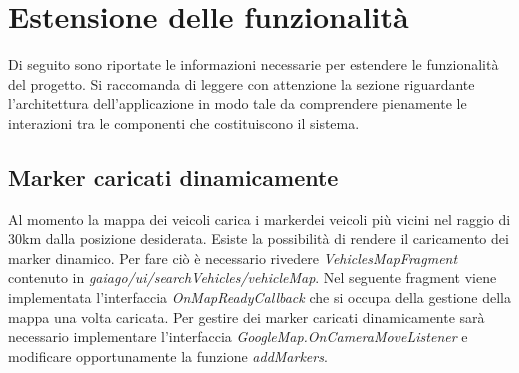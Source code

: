 \section{Estensione delle funzionalità}
Di seguito sono riportate le informazioni necessarie per estendere le funzionalità del progetto. Si raccomanda di leggere con attenzione la sezione riguardante l'architettura dell'applicazione in modo tale da comprendere pienamente le interazioni tra le componenti che costituiscono il sistema.
\subsection{Marker caricati dinamicamente}
Al momento la mappa dei veicoli carica i marker\glosp dei veicoli più vicini nel raggio di 30km dalla posizione desiderata. Esiste la possibilità di rendere il caricamento dei marker dinamico. Per fare ciò è necessario rivedere \textit{VehiclesMapFragment} contenuto in \textit{gaiago/ui/searchVehicles/vehicleMap}.
Nel seguente fragment viene implementata l'interfaccia \textit{OnMapReadyCallback} che si occupa della gestione della mappa una volta caricata. Per gestire dei marker caricati dinamicamente sarà necessario implementare l'interfaccia \textit{GoogleMap.OnCameraMoveListener} e modificare opportunamente la funzione \textit{addMarkers}.